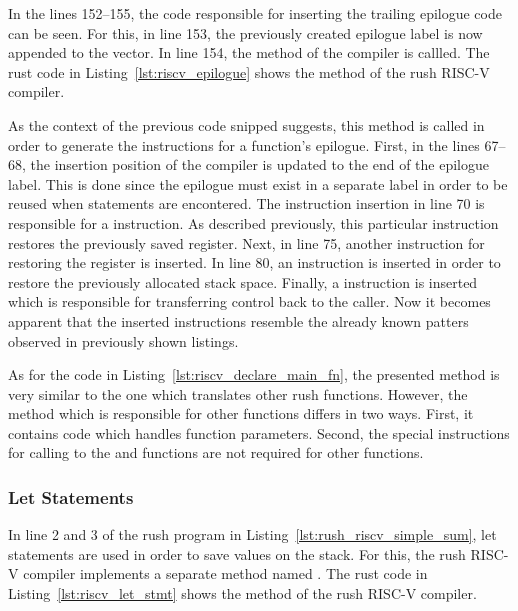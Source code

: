 In the lines 152--155, the code responsible for inserting the trailing epilogue code can be seen.
For this, in line 153, the previously created epilogue label is now appended to the  vector.
In line 154, the  method of the compiler is callled.
The rust code in Listing~\ref{lst:riscv_epilogue} shows the  method of the rush RISC-V compiler.


As the context of the previous code snipped suggests, this method is called in order to generate the instructions for a function's epilogue.
First, in the lines 67--68, the insertion position of the compiler is updated to the end of the epilogue label.
This is done since the epilogue must exist in a separate label in order to be reused when  statements are encontered.
The instruction insertion in line 70 is responsible for a  instruction.
As described previously, this particular instruction restores the previously saved  register.
Next, in line 75, another  instruction for restoring the  register is inserted.
In line 80, an  instruction is inserted in order to restore the previously allocated stack space.
Finally, a  instruction is inserted which is responsible for transferring control back to the caller.
Now it becomes apparent that the inserted instructions resemble the already known patters observed in previously shown listings.

As for the code in Listing~\ref{lst:riscv_declare_main_fn},
the presented method is very similar to the one which translates other rush functions.
However, the  method which is responsible for other functions differs in two ways.
First, it contains code which handles function parameters.
Second, the special instructions for calling to the  and  functions are not required for other functions.

\subsubsection{Let Statements}

In line 2 and 3 of the rush program in Listing~\ref{lst:rush_riscv_simple_sum}, let statements are used in order to save values on the stack.
For this, the rush RISC-V compiler implements a separate method named .
The rust code in Listing~\ref{lst:riscv_let_stmt} shows the  method of the rush RISC-V compiler.

